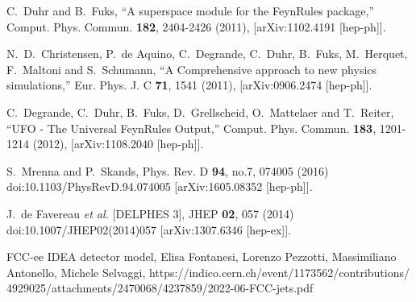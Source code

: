 \documentclass[11pt,onecolumn,english,showpacs,preprintnumbers,amsmath,amssymb,floatfix,nofootinbib]{revtex4-1}
\begin{document}
\begin{thebibliography}{}
C.~Duhr and B.~Fuks,
``A superspace module for the FeynRules package,''
Comput. Phys. Commun. \textbf{182}, 2404-2426 (2011),
[arXiv:1102.4191 [hep-ph]].






N.~D.~Christensen, P.~de Aquino, C.~Degrande, C.~Duhr, B.~Fuks, M.~Herquet, F.~Maltoni and S.~Schumann,
``A Comprehensive approach to new physics simulations,''
Eur. Phys. J. C \textbf{71}, 1541 (2011),
[arXiv:0906.2474 [hep-ph]].





C.~Degrande, C.~Duhr, B.~Fuks, D.~Grellscheid, O.~Mattelaer and T.~Reiter,
``UFO - The Universal FeynRules Output,''
Comput. Phys. Commun. \textbf{183}, 1201-1214 (2012),
[arXiv:1108.2040 [hep-ph]].








S.~Mrenna and P.~Skands,
Phys. Rev. D \textbf{94}, no.7, 074005 (2016)
doi:10.1103/PhysRevD.94.074005
[arXiv:1605.08352 [hep-ph]].




J.~de Favereau \textit{et al.} [DELPHES 3],
JHEP \textbf{02}, 057 (2014)
doi:10.1007/JHEP02(2014)057
[arXiv:1307.6346 [hep-ex]].






FCC-ee IDEA detector model, Elisa Fontanesi, Lorenzo Pezzotti, Massimiliano Antonello, Michele Selvaggi,
https://indico.cern.ch/event/1173562/contributions/\\4929025/attachments/2470068/4237859/2022-06-FCC-jets.pdf

	







\end{thebibliography}
\end{document}
